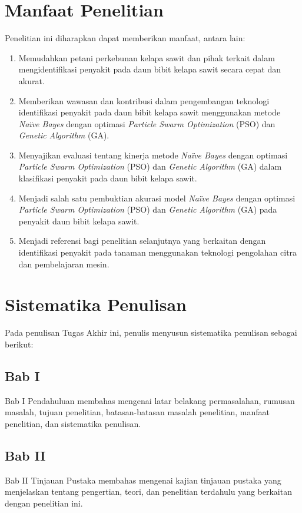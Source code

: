 \section{Manfaat Penelitian} \label{I.Manfaat}
\indent Penelitian ini diharapkan dapat memberikan manfaat, antara lain:
\begin{enumerate}[noitemsep]
	\item Memudahkan petani perkebunan kelapa sawit dan pihak terkait dalam mengidentifikasi penyakit pada daun bibit kelapa sawit secara cepat dan akurat. 
	\item Memberikan wawasan dan kontribusi dalam pengembangan teknologi identifikasi penyakit pada daun bibit kelapa sawit menggunakan metode \textit{Naïve Bayes} dengan optimasi \textit{Particle Swarm Optimization} (PSO) dan \textit{Genetic Algorithm} (GA).
	\item Menyajikan evaluasi tentang kinerja metode \textit{Naïve Bayes} dengan optimasi \textit{Particle Swarm Optimization} (PSO) dan \textit{Genetic Algorithm} (GA) dalam klasifikasi penyakit pada daun bibit kelapa sawit.
	\item Menjadi salah satu pembuktian akurasi model \textit{Naïve Bayes} dengan optimasi \textit{Particle Swarm Optimization} (PSO) dan \textit{Genetic Algorithm} (GA) pada penyakit daun bibit kelapa sawit.
	\item Menjadi referensi bagi penelitian selanjutnya yang berkaitan dengan identifikasi penyakit pada tanaman menggunakan teknologi pengolahan citra dan pembelajaran mesin.
\end{enumerate}

\section{Sistematika Penulisan} \label{I.Sistematika}
Pada penulisan Tugas Akhir ini, penulis menyusun sistematika penulisan sebagai berikut:
\subsection{Bab I}
\indent Bab I Pendahuluan membahas mengenai latar belakang permasalahan, rumusan masalah, tujuan penelitian, batasan-batasan masalah penelitian, manfaat penelitian, dan sistematika penulisan.
\subsection{Bab II}
\indent Bab II Tinjauan Pustaka membahas mengenai kajian tinjauan pustaka yang menjelaskan tentang pengertian, teori, dan penelitian terdahulu yang berkaitan dengan penelitian ini.
